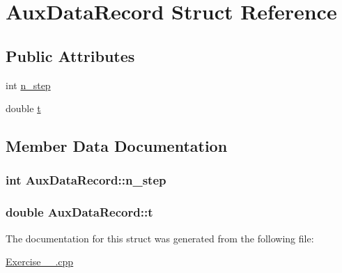 \hypertarget{structAuxDataRecord}{\section{Aux\-Data\-Record Struct Reference}
\label{structAuxDataRecord}
}
\subsection*{Public Attributes}
\begin{DoxyCompactItemize}
\item 
int \hyperlink{structAuxDataRecord_ae33d0afc48a9765043154137a723b6dc}{n\-\_\-step}
\item 
double \hyperlink{structAuxDataRecord_afd53c73068acba685cba3491e942fb17}{t}
\end{DoxyCompactItemize}


\subsection{Member Data Documentation}
\hypertarget{structAuxDataRecord_ae33d0afc48a9765043154137a723b6dc}{
\subsubsection[{n\-\_\-step}]{\setlength{\rightskip}{0pt plus 5cm}int Aux\-Data\-Record\-::n\-\_\-step}}\label{structAuxDataRecord_ae33d0afc48a9765043154137a723b6dc}
\hypertarget{structAuxDataRecord_afd53c73068acba685cba3491e942fb17}{
\subsubsection[{t}]{\setlength{\rightskip}{0pt plus 5cm}double Aux\-Data\-Record\-::t}}\label{structAuxDataRecord_afd53c73068acba685cba3491e942fb17}


The documentation for this struct was generated from the following file\-:\begin{DoxyCompactItemize}
\item 
\hyperlink{Exercise__4__3_8cpp}{Exercise\-\_\-\_.\-cpp}\end{DoxyCompactItemize}
